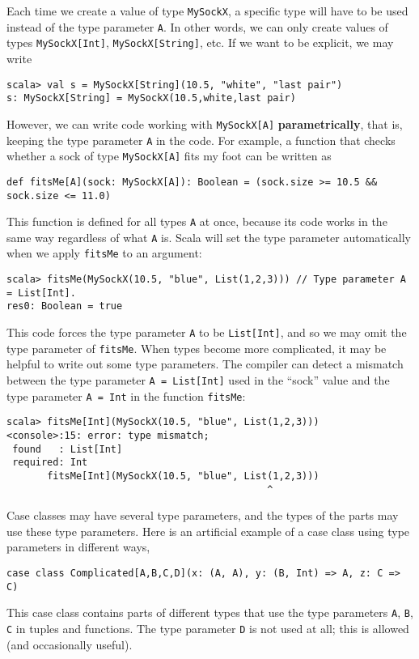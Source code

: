 Each time we create a value of type \lstinline!MySockX!, a specific
type will have to be used instead of the type parameter \lstinline!A!.
In other words, we can only create values of types \lstinline!MySockX[Int]!,
\lstinline!MySockX[String]!, etc. If we want to be explicit, we may
write
\begin{lstlisting}
scala> val s = MySockX[String](10.5, "white", "last pair")
s: MySockX[String] = MySockX(10.5,white,last pair) 
\end{lstlisting}
However, we can write code working with \lstinline!MySockX[A]! \textbf{parametrically},
that is, keeping the type parameter \lstinline!A! in the code. For
example, a function that checks whether a sock of type \lstinline!MySockX[A]!
fits my foot can be written as
\begin{lstlisting}
def fitsMe[A](sock: MySockX[A]): Boolean = (sock.size >= 10.5 && sock.size <= 11.0)
\end{lstlisting}
This function is defined for all types \lstinline!A! at once, because
its code works in the same way regardless of what \lstinline!A! is.
Scala will set the type parameter automatically when we apply \lstinline!fitsMe!
to an argument:
\begin{lstlisting}
scala> fitsMe(MySockX(10.5, "blue", List(1,2,3))) // Type parameter A = List[Int].
res0: Boolean = true
\end{lstlisting}
This code forces the type parameter \lstinline!A! to be \lstinline!List[Int]!,
and so we may omit the type parameter of \lstinline!fitsMe!. When
types become more complicated, it may be helpful to write out some
type parameters. The compiler can detect a mismatch between the type
parameter \lstinline!A = List[Int]! used in the ``sock'' value
and the type parameter \lstinline!A = Int! in the function \lstinline!fitsMe!:
\begin{lstlisting}
scala> fitsMe[Int](MySockX(10.5, "blue", List(1,2,3)))
<console>:15: error: type mismatch;
 found   : List[Int]
 required: Int
       fitsMe[Int](MySockX(10.5, "blue", List(1,2,3)))
                                             ^ 
\end{lstlisting}

Case classes may have several type parameters, and the types of the
parts may use these type parameters. Here is an artificial example
of a case class using type parameters in different ways,
\begin{lstlisting}
case class Complicated[A,B,C,D](x: (A, A), y: (B, Int) => A, z: C => C)
\end{lstlisting}
This case class contains parts of different types that use the type
parameters \lstinline!A!, \lstinline!B!, \lstinline!C! in tuples
and functions. The type parameter \lstinline!D! is not used at all;
this is allowed (and occasionally useful).

